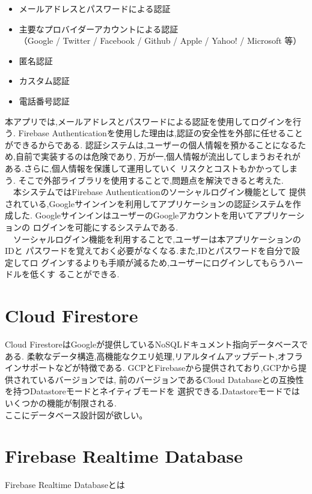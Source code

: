 \begin{itemize}
	\item メールアドレスとパスワードによる認証 \\

	\item 主要なプロバイダーアカウントによる認証 \\
	（Google / Twitter / Facebook / Github / Apple / Yahoo! / Microsoft 等） \\

	\item 匿名認証 \\

	\item カスタム認証 \\

	\item 電話番号認証 \\
\end{itemize}

本アプリでは,メールアドレスとパスワードによる認証を使用してログインを行う.
Firebase Authenticationを使用した理由は,認証の安全性を外部に任せることができるからである.
認証システムは,ユーザーの個人情報を預かることになるため,自前で実装するのは危険であり,
万が一,個人情報が流出してしまうおそれがある.さらに,個人情報を保護して運用していく
リスクとコストもかかってしまう.
そこで外部ライブラリを使用することで,問題点を解決できると考えた. \\
　本システムではFirebase Authenticationのソーシャルログイン機能として
提供されている,Googleサインインを利用してアプリケーションの認証システムを作成した. 
GoogleサインインはユーザーのGoogleアカウントを用いてアプリケーションの
ログインを可能にするシステムである. \\
　ソーシャルログイン機能を利用することで,ユーザーは本アプリケーションのIDと
パスワードを覚えておく必要がなくなる.また,IDとパスワードを自分で設定してロ
グインするよりも手順が減るため,ユーザーにログインしてもらうハードルを低くす
ることができる. 

\clearpage

\section{Cloud Firestore}
\label{sec:reference_cloud}
Cloud FirestoreはGoogleが提供しているNoSQLドキュメント指向データベースである.
柔軟なデータ構造,高機能なクエリ処理,リアルタイムアップデート,オフラインサポートなどが特徴である.
GCPとFirebaseから提供されており,GCPから提供されているバージョンでは,
前のバージョンであるCloud Databaseとの互換性を持つDatastoreモードとネイティブモードを
選択できる.Datastoreモードではいくつかの機能が制限される. \\

ここにデータベース設計図が欲しい。

\section{Firebase Realtime Database}
\label{sec:reference_realtime}
Firebase Realtime Databaseとは